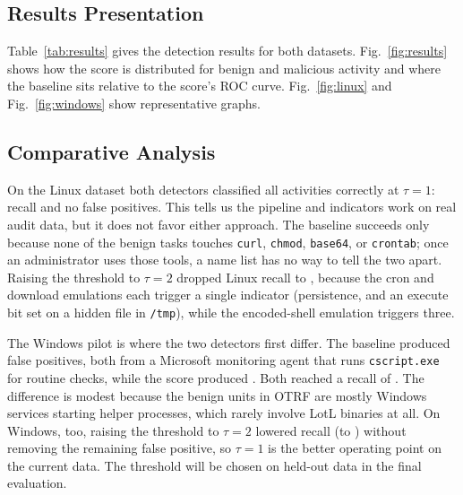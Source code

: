 \documentclass[conference]{IEEEtran}
\begin{document}
\subsection{Results Presentation}

Table~\ref{tab:results} gives the detection results for both datasets.
Fig.~\ref{fig:results} shows how the score is distributed for benign and
malicious activity and where the baseline sits relative to the score's ROC
curve. Fig.~\ref{fig:linux} and Fig.~\ref{fig:windows} show representative
graphs.







\subsection{Comparative Analysis}
On the Linux dataset both detectors classified all \LinTotal{} activities
correctly at $\tau=1$: recall \LinScoreRec{} and no false positives. This
tells us the pipeline and indicators work on real audit data, but it does not
favor either approach. The baseline succeeds only because none of the benign
tasks touches \texttt{curl}, \texttt{chmod}, \texttt{base64}, or
\texttt{crontab}; once an administrator uses those tools, a name list has no
way to tell the two apart. Raising the threshold to $\tau=2$ dropped Linux
recall to \LinScoreTwoRec{}, because the cron and download emulations each
trigger a single indicator (persistence, and an execute bit set on a hidden
file in \texttt{/tmp}), while the encoded-shell emulation triggers three.

The Windows pilot is where the two detectors first differ. The baseline
produced \WinBaseFP{} false positives, both from a Microsoft monitoring agent
that runs \texttt{cscript.exe} for routine checks, while the score produced
\WinScoreFP{}. Both reached a recall of \WinScoreRec{}. The difference is
modest because the benign units in OTRF are mostly Windows services starting
helper processes, which rarely involve LotL binaries at all. On Windows, too,
raising the threshold to $\tau=2$ lowered recall (to \WinScoreTwoRec{})
without removing the remaining false positive, so $\tau=1$ is the better
operating point on the current data. The threshold will be chosen on
held-out data in the final evaluation.
\end{document}
